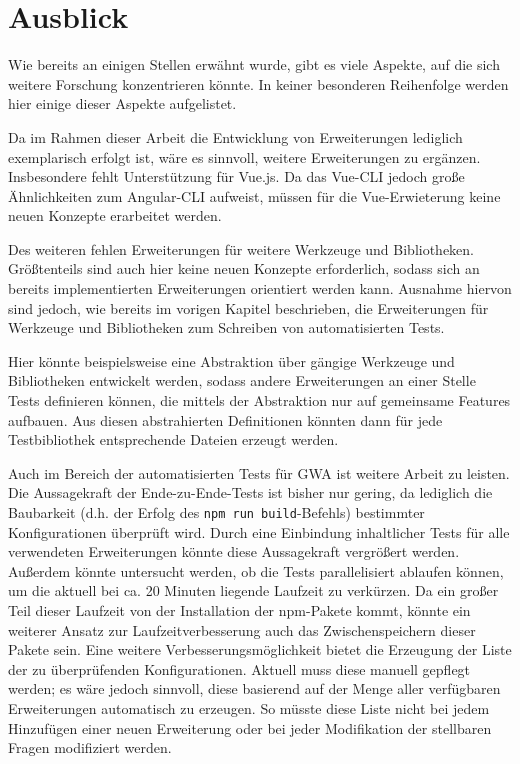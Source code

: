 \section{Ausblick}
\label{further_research}

Wie bereits an einigen Stellen erwähnt wurde, gibt es viele Aspekte, auf die sich weitere Forschung konzentrieren könnte. In keiner besonderen Reihenfolge werden hier einige dieser Aspekte aufgelistet.

Da im Rahmen dieser Arbeit die Entwicklung von Erweiterungen lediglich exemplarisch erfolgt ist, wäre es sinnvoll, weitere Erweiterungen zu ergänzen. Insbesondere fehlt Unterstützung für Vue.js. Da das Vue-\gls{CLI} jedoch große Ähnlichkeiten zum Angular-\gls{CLI} aufweist, müssen für die Vue-Erwieterung keine neuen Konzepte erarbeitet werden.

Des weiteren fehlen Erweiterungen für weitere Werkzeuge und Bibliotheken. Größtenteils sind auch hier keine neuen Konzepte erforderlich, sodass sich an bereits implementierten Erweiterungen orientiert werden kann. Ausnahme hiervon sind jedoch, wie bereits im vorigen Kapitel beschrieben, die Erweiterungen für Werkzeuge und Bibliotheken zum Schreiben von automatisierten Tests.

Hier könnte beispielsweise eine Abstraktion über gängige Werkzeuge und Bibliotheken entwickelt werden, sodass andere Erweiterungen an einer Stelle Tests definieren können, die mittels der Abstraktion nur auf gemeinsame Features aufbauen. Aus diesen abstrahierten Definitionen könnten dann für jede Testbibliothek entsprechende Dateien erzeugt werden.

Auch im Bereich der automatisierten Tests für \gls{GWA} ist weitere Arbeit zu leisten. Die Aussagekraft der Ende-zu-Ende-Tests ist bisher nur gering, da lediglich die Baubarkeit (d.h. der Erfolg des \verb/npm run build/-Befehls) bestimmter Konfigurationen überprüft wird. Durch eine Einbindung inhaltlicher Tests für alle verwendeten Erweiterungen könnte diese Aussagekraft vergrößert werden. Außerdem könnte untersucht werden, ob die Tests parallelisiert ablaufen können, um die aktuell bei ca. 20 Minuten liegende Laufzeit zu verkürzen. Da ein großer Teil dieser Laufzeit von der Installation der \gls{npm}-Pakete kommt, könnte ein weiterer Ansatz zur Laufzeitverbesserung auch das Zwischenspeichern dieser Pakete sein. Eine weitere Verbesserungsmöglichkeit bietet die Erzeugung der Liste der zu überprüfenden Konfigurationen. Aktuell muss diese manuell gepflegt werden; es wäre jedoch sinnvoll, diese basierend auf der Menge aller verfügbaren Erweiterungen automatisch zu erzeugen. So müsste diese Liste nicht bei jedem Hinzufügen einer neuen Erweiterung oder bei jeder Modifikation der stellbaren Fragen modifiziert werden.

